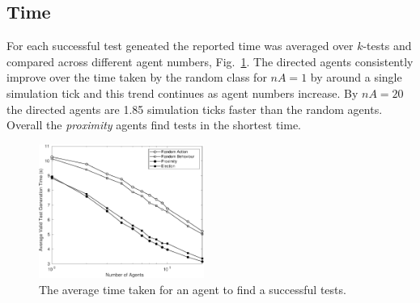 \documentclass[letterpaper, 10 pt, journal, twoside]{IEEEtran}
\begin{document}
\subsection{Time}
For each successful test geneated the reported time was averaged over $k$-tests and compared across different agent numbers, Fig.~\ref{Time}. The directed agents consistently improve over the time taken by the random class for $nA=1$ by around a single simulation tick and this trend continues as agent numbers increase. By $nA=20$ the directed agents are 1.85 simulation ticks faster than the random agents.
Overall the \textit{proximity} agents find tests in the shortest time.

\begin{figure}[!t]
	\centering
\includegraphics[width=0.48\textwidth]{Time.pdf}
	\caption{The average time taken for an agent to find a successful tests.}
	\label{Time}
\end{figure}




\end{document}
